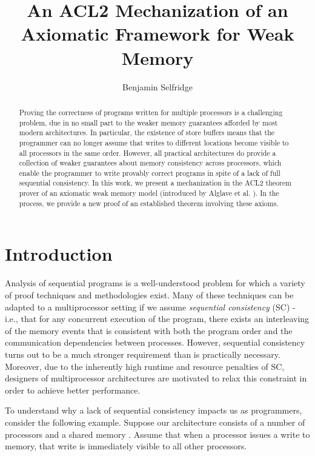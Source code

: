 \documentclass[]{eptcs}
\title{An ACL2 Mechanization of an Axiomatic Framework for Weak Memory}
\author{Benjamin Selfridge
\institute{University of Texas at Austin\\ Austin, TX}
\email{benself@cs.utexas.edu}
}
\begin{document}
\maketitle

\begin{abstract}Proving the correctness of programs written for multiple processors is a challenging problem, due in no small part to the weaker memory guarantees afforded by most modern architectures. In particular, the existence of store buffers means that the programmer can no longer assume that writes to different locations become visible to all processors in the same order. However, all practical architectures do provide a collection of weaker guarantees about memory consistency across processors, which enable the programmer to write provably correct programs in spite of a lack of full sequential consistency. In this work, we present a mechanization in the ACL2 theorem prover of an axiomatic weak memory model (introduced by Alglave et al. \cite{alglave_cats}). In the process, we provide a new proof of an established theorem involving these axioms.
\end{abstract}

\section{Introduction}

Analysis of sequential programs is a well-understood problem for which a variety of proof techniques and methodologies exist. \cite{hoare69} Many of these techniques can be adapted to a multiprocessor setting if we assume \emph{sequential consistency} (SC) - i.e., that for any concurrent execution of the program, there exists an interleaving of the memory events that is consistent with both the program order and the communication dependencies between processes. \cite{lamport79, owicki76} However, sequential consistency turns out to be a much stronger requirement than is practically necessary. Moreover, due to the inherently high runtime and resource penalties of SC, designers of multiprocessor architectures are motivated to relax this constraint in order to achieve better performance.

To understand why a lack of sequential consistency impacts us as programmers, consider the following example. Suppose our architecture consists of a number of processors  and a shared memory . Assume that when a processor issues a write to memory, that write is immediately visible to all other processors. 
\end{document}
